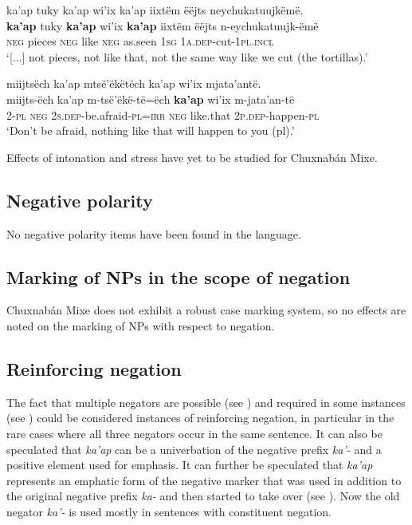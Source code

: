 \documentclass[output=paper,colorlinks,citecolor=brown,draft]{langscibook}
\begin{document}
\ea\label{ex:mix:117}
    \glll ka’ap tuky ka’ap wi’ix ka’ap iixtëm ëëjts neychukatuujkëmë. \\
          \textbf{ka’ap} tuky \textbf{ka’ap} wi’ix \textbf{ka’ap} iixtëm ëëjts n-eychukatuujk-ëmë \\
          \textsc{neg} pieces \textsc{neg} like \textsc{neg} as.seen 1\textsc{sg} 1\textsc{a.dep}{}-cut-1\textsc{pl.incl} \\
    \glt ‘[...] not pieces, not like that, not the same way like we cut (the tortillas).’
\z

\ea\label{ex:mix:118}
    \glll miijtsëch ka’ap mtsë’ëkëtëch ka’ap wi’ix mjata’antë. \\
          miijts-ëch ka’ap m-tsë’ëkë-të=ëch \textbf{ka’ap} wi’ix m-jata’an-të  \\
          2-\textsc{pl} \textsc{neg} 2\textsc{s.dep-}be.afraid-\textsc{pl=irr} \textsc{neg} like.that \textsc{2p.dep}-happen-\textsc{pl} \\
    \glt ‘Don’t be afraid, nothing like that will happen to you (pl).’
\z

Effects of intonation and stress have yet to be studied for Chuxnabán Mixe.

\subsection{Negative polarity}\label{sec:mix:4.2}

No negative polarity items have been found in the language.


\subsection{Marking of NPs in the scope of negation}\label{sec:mix:4.3}

Chuxnabán Mixe does not exhibit a robust case marking system, so no effects are noted on the marking of NPs with respect to negation.

\subsection{Reinforcing negation}\label{sec:mix:4.4}

The fact that multiple negators are possible (see ) and required in some instances (see ) could be considered instances of reinforcing negation, in particular in the rare cases where all three negators occur in the same sentence. It can also be speculated that \textit{ka’ap} can be a univerbation of the negative prefix \textit{ka’-} and a positive element used for emphasis. It can further be speculated that \textit{ka’ap} represents an emphatic form of the negative marker that was used in addition to the original negative prefix \textit{ka-} and then started to take over (see \citealt{Gelderen2016}). Now the old negator \textit{ka’-} is used mostly in sentences with constituent negation.
\end{document}
